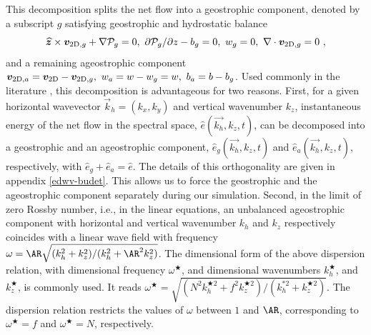 \documentclass[../Rajarshi-thesis-draft.tex]{subfiles}
\begin{document}
This decomposition splits the net flow into a geostrophic component, denoted by a subscript $g$ satisfying geostrophic and hydrostatic balance
\begin{equation}
    \label{edwv-gb}
    \bsh z \times \vec{v}_{{\rm 2D},g} + \del \mathcal{P}_g =0, \ \p \mathcal{P}_g/\p z-b_g=0, \ w_g=0, \ \del \cdot \vec{v}_{{\rm 2D},g}=0 \ ,
\end{equation}
and a remaining ageostrophic component $\vec{v}_{{\rm 2D},a} = \vec{v}_{\rm 2D} - \vec{v}_{{\rm 2D},g}, ~w_{a} = w - w_g = w,~ b_{a} = b - b_g $. Used commonly in the literature \citep{Bartello95, Embid_Majda_1998, Hernandez_Smith_Stechmann_2014, TD20}, this decomposition is advantageous for two reasons. First, for a given horizontal wavevector $\vec{k}_h=(k_x, k_y)$ and vertical wavenumber $k_z$, instantaneous energy of the net flow in the spectral space, $\hat{e}(\vec{k_h},k_z,t)$, can be decomposed into a geostrophic and an ageostrophic component, $\hat{e}_g(\vec{k_h},k_z,t)$ and $\hat{e}_a(\vec{k_h},k_z,t)$, respectively, with $\hat{e}_g + \hat{e}_a = \hat{e}$. The details of this orthogonality are given in appendix \ref{edwv-budet}. This allows us to force the geostrophic and the ageostrophic component separately during our simulation. Second, in the limit of zero Rossby number, i.e., in the linear equations, an unbalanced ageostrophic component with horizontal and vertical wavenumber $k_h$ and $k_z$ respectively coincides with a linear wave field with frequency $\omega = \AR \sqrt{(k_h^2 + k_z^2)/(k_h^2 + \AR^2 k_z^2)}$.
The dimensional form of the above dispersion relation, with dimensional frequency $\omega^\bigstar$, and dimensional wavenumbers $k_h^\bigstar$, and $k_z^\bigstar$, is commonly used. It reads $\omega^\bigstar = \sqrt{(N^2 k_h^{\bigstar 2} + f^2 k_z^{\bigstar 2})/(k_h^{*2} + k_z^{\bigstar 2})} $. The dispersion relation restricts the values of $\omega$ between $1$ and $\AR$, corresponding to $\omega^\bigstar=f$ and $\omega^\bigstar=N$, respectively.
\end{document}
